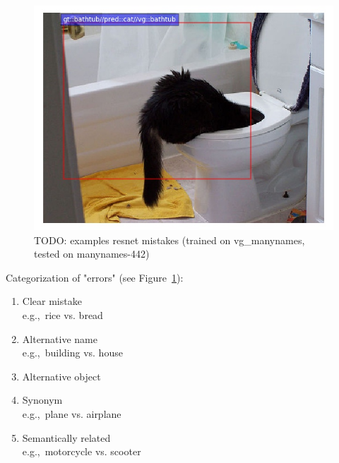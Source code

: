\begin{figure}
	\includegraphics[scale=.2]{images/2371657.jpg}
	
	\caption{TODO: examples resnet mistakes (trained on vg\_manynames, tested on manynames-442)\label{fig:mistakes}}
\end{figure}

Categorization of "errors" (see Figure~\ref{fig:mistakes}):
\begin{enumerate}
	\item Clear mistake \\
	e.g.,\ rice vs. bread
	\item Alternative name\\
	e.g.,\ building vs. house
	\item Alternative object 
	\item Synonym\\
	e.g.,\ plane vs. airplane
	\item Semantically related\\
	e.g.,\  motorcycle vs. scooter
\end{enumerate}


